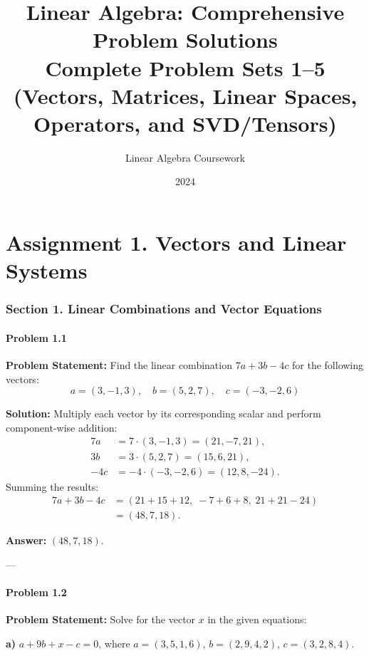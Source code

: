 \documentclass[11pt, a4paper]{article}
\title{\textbf{Linear Algebra: Comprehensive Problem Solutions}\\ \large Complete Problem Sets 1–5 (Vectors, Matrices, Linear Spaces, Operators, and SVD/Tensors)}
\author{Linear Algebra Coursework}
\date{2024}
\begin{document}
\maketitle

\tableofcontents
\newpage

\part{Assignment 1. Vectors and Linear Systems}

\section{Section 1. Linear Combinations and Vector Equations}

\subsection*{Problem 1.1}
\textbf{Problem Statement:} Find the linear combination $7a+3b-4c$ for the following vectors:
$$ a = (3, -1, 3), \quad b = (5, 2, 7), \quad c = (-3, -2, 6) $$

\textbf{Solution:}
Multiply each vector by its corresponding scalar and perform component-wise addition:
\begin{align*}
7a &= 7 \cdot (3, -1, 3) = (21, -7, 21), \\
3b &= 3 \cdot (5, 2, 7) = (15, 6, 21), \\
-4c &= -4 \cdot (-3, -2, 6) = (12, 8, -24).
\end{align*}
Summing the results:
\begin{align*}
7a + 3b - 4c &= (21 + 15 + 12, \; -7 + 6 + 8, \; 21 + 21 - 24) \\
&= (48, 7, 18).
\end{align*}

\textbf{Answer:} $(48, 7, 18)$.

---

\subsection*{Problem 1.2}
\textbf{Problem Statement:} Solve for the vector $x$ in the given equations:

\medskip
\textbf{a)} $a + 9b + x - c = 0$, where $a = (3, 5, 1, 6)$, $b = (2, 9, 4, 2)$, $c = (3, 2, 8, 4)$.
\end{document}

